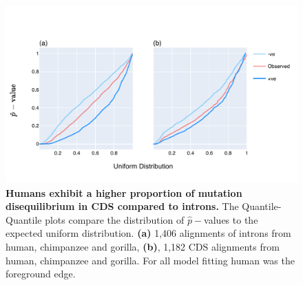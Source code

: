 \begin{figure}[h]
\centering
\includegraphics[width=	\textwidth]{figures/plots/primate/LRT-QQ.pdf}
\caption[Humans exhibit a higher proportion of mutation disequilibrium in CDS compared to introns]{\textbf{Humans exhibit a higher proportion of mutation disequilibrium in CDS compared to introns.} The Quantile-Quantile plots compare the distribution of $\hat p-$values to the expected uniform distribution. \textbf{(a)} 1,406 alignments of introns from human, chimpanzee and gorilla, \textbf{(b)}, 1,182 CDS alignments from human, chimpanzee and gorilla. For all model fitting human was the foreground edge. }
\label{fig:primate_lrt_qq}
\end{figure}
